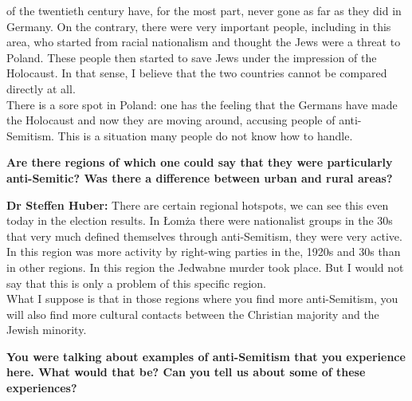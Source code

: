 of the twentieth century have, for the most part, never gone as far as they did in Germany. On the contrary, there were very important people, including in this area, who started from racial nationalism and thought the Jews were a threat to Poland. These people then started to save Jews under the impression of the Holocaust. In that sense, I believe that the two countries cannot be compared directly at all.\\
There is a sore spot in Poland: one has the feeling that the Germans have made the Holocaust and now they are moving around, accusing people of anti-Semitism. This is a situation many people do not know how to handle. 

\textbf{Are there regions of which one could say that they were particularly anti-Semitic? Was there a difference between urban and rural areas?} 

\textbf{Dr Steffen Huber:} There are certain regional hotspots, we can see this even today in the election results. In Łomża there were nationalist groups in the 30s that very much defined themselves through anti-Semitism, they were very active.\\
In this region was more activity by right-wing parties in the, 1920s and 30s than in other regions. In this region the Jedwabne murder took place. But I would not say that this is only a problem of this specific region.\\
What I suppose is that in those regions where you find more anti-Semitism, you will also find more cultural contacts between the Christian majority and the Jewish minority. 

\textbf{You were talking about examples of anti-Semitism that you experience here. What would that be? Can you tell us about some of these experiences?} 

